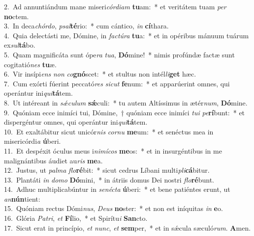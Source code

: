 {2.~}Ad annuntiándum mane miseri\textit{cór}\textit{di}\textit{am} \textbf{tu}am:~* et veritátem tuam \textit{per} \textbf{no}ctem.\\
{3.~}In deca\textit{chór}\textit{do}, \textit{psal}\textbf{té}rio:~* cum cántico, \textit{in} \textbf{cí}thara.\\
{4.~}Quia delectásti me, Dómine, in \textit{fa}\textit{ctú}\textit{ra} \textbf{tu}a:~* et in opéribus mánuum tuárum ex\textit{sul}\textbf{tá}bo.\\
{5.~}Quam magnificáta sunt ópe\textit{ra} \textit{tu}\textit{a}, \textbf{Dó}mine!~* nimis profúndæ factæ sunt cogitatió\textit{nes} \textbf{tu}æ.\\
{6.~}Vir insípi\textit{ens} \textit{non} \textit{co}\textbf{gnó}scet:~* et stultus non intél\textit{li}\textbf{get} hæc.\\
{7.~}Cum exórti fúerint peccató\textit{res} \textit{si}\textit{cut} \textbf{fe}num:~* et apparúerint omnes, qui operántur ini\textit{qui}\textbf{tá}tem.\\
{8.~}Ut intéreant in \textit{sǽ}\textit{cu}\textit{lum} \textbf{sǽ}culi:~* tu autem Altíssimus in ætér\textit{num}, \textbf{Dó}mine.\\
{9.~}Quóniam ecce inimíci tui, Dómine,~† quóniam ecce inimíci \textit{tu}\textit{i} \textit{pe}\textbf{rí}bunt:~* et dispergéntur omnes, qui operántur ini\textit{qui}\textbf{tá}tem.\\
{10.~}Et exaltábitur sicut unicór\textit{nis} \textit{cor}\textit{nu} \textbf{me}um:~* et senéctus mea in misericórdi\textit{a} \textbf{ú}beri.\\
{11.~}Et despéxit óculus meus i\textit{ni}\textit{mí}\textit{cos} \textbf{me}os:~* et in insurgéntibus in me malignántibus áudiet au\textit{ris} \textbf{me}a.\\
{12.~}Justus, ut \textit{pal}\textit{ma} \textit{flo}\textbf{ré}bit:~* sicut cedrus Líbani multi\textit{pli}\textbf{cá}bitur.\\
{13.~}Plantáti \textit{in} \textit{do}\textit{mo} \textbf{Dó}mini,~* in átriis domus Dei nostri \textit{flo}\textbf{ré}bunt.\\
{14.~}Adhuc multiplicabúntur in \textit{se}\textit{né}\textit{cta} \textbf{ú}beri:~* et bene patiéntes erunt, ut \textit{an}\textbf{nún}tient:\\
{15.~}Quóniam rectus Dómi\textit{nus}, \textit{De}\textit{us} \textbf{no}ster:~* et non est iníquitas \textit{in} \textbf{e}o.\\
{16.~}Glória \textit{Pa}\textit{tri}, \textit{et} \textbf{Fí}lio,~* et Spirítu\textit{i} \textbf{San}cto.\\
{17.~}Sicut erat in princípio, \textit{et} \textit{nunc}, \textit{et} \textbf{sem}per,~* et in sǽcula sæculó\textit{rum}. \textbf{A}men.\\
